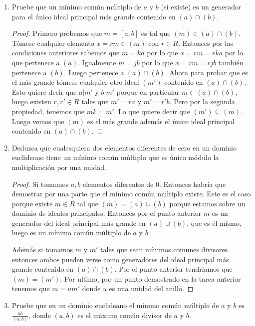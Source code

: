 \documentclass[letter,twoside,12pt]{article}
\begin{document}
\begin{enumerate}[label=\textbf{(\alph*)}]
\item Pruebe que un m\'inimo com\'un m\'ultiplo de $ a $ y $ b $ (si existe) es un generador para el \'unico ideal principal m\'as grande contenido en $ (a) \cap (b) $.

\begin{proof}
Primero probemos que $m=[a,b]$ es tal que $(m) \in (a) \cap (b)$. T\'omese cualquier elemento $x=rm \in (m)$ con $r \in R$. Entonces por las condiciones anteriores sabemos que $m=ka$ por lo que $x=rm=rka$ por lo que pertenece a $(a)$. Igualmente $m=jb$ por lo que $x=rm=rjb$ tambi\'en pertenece a $(b)$. Luego pertenece a $(a) \cap (b)$. Ahora para probar que es el m\'as grande t\'omese cualquier otro ideal $(m')$ contenido en $(a) \cap (b)$. Esto quiere decir que $a|m'$ y $b|m'$ porque en particular $m \in (a) \cap (b)$, luego existen $r,r' \in R$ tales que $ m'=ra $ y $ m'=r'b $. Pero por la segunda propiedad, tenemos que $mk=m'$. Lo que quiere decir que $(m') \subseteq (m)$. Luego vemos que $ (m) $ es el m\'as grande  adem\'as el \'unico ideal principal contenido en $ (a) \cap (b) $. 
\end{proof}

\item Deduzca que cualesquiera dos elementos diferentes de cero en un dominio euclideano tiene un m\'inimo com\'un m\'ultiplo que es \'unico m\'odulo la multiplicaci\'on por una unidad.

\begin{proof}
Si tomamos $a,b $ elementos diferentes de 0. Entonces habr\'ia que demostrar por una parte que el m\'inimo com\'un multiplo existe. Este es el caso porque existe $m \in R$ tal que $ (m)=(a) \cup (b) $ porque estamos sobre un dominio de ideales principales. Entonces por el punto anterior $m$ es un generador del ideal principal m\'as grande en $ (a) \cup (b) $, que es \'el mismo, luego es un m\'inimo com\'un m\'ultiplo de $a$ y $b$. 

Adem\'as si tomamos $m$ y $m'$ tales que sean m\'inimos comunes divisores entonces ambos pueden verse como generadores del ideal principal m\'as grande contenido en $(a) \cap (b)$. Por el punto anterior tendriamos que $(m)=(m')$. Por ultimo, por un punto demostrado en la tarea anterior tenemos que $m=um'$ donde $u$ es una unidad del anillo.
\end{proof}

\item Pruebe que en un dominio euclideano el m\'inimo com\'un m\'ultiplo de $ a $ y $ b $ es $ \frac{ab}{(a,b)} $, donde $ (a,b) $ es el m\'aximo com\'un divisor de $ a $ y $ b $. 


\end{enumerate}
\end{document}
